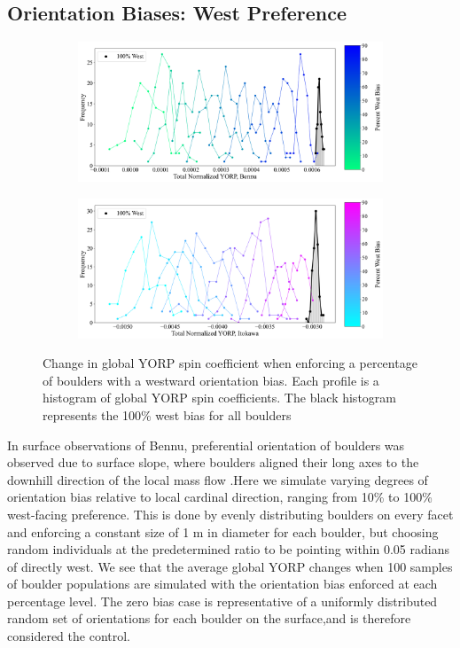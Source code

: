 \subsection{Orientation Biases: West Preference}
\begin{figure}[t!]
    \centering
    \begin{subfigure}{0.49\textwidth}
        \centering
        \includegraphics[width=\textwidth]{fig/bennu_orient_samesize_recreate.png}
    \end{subfigure}
    \hfill
    \begin{subfigure}{0.49\textwidth}
        \centering
        \includegraphics[width=\textwidth]{fig/itokawa_orient_samesize_recreate.png}
    \end{subfigure}
    \caption{Change in global YORP spin coefficient when enforcing a percentage of boulders with a westward orientation bias. Each profile is a histogram of global YORP spin coefficients. The black histogram represents the 100\% west bias for all boulders}
    \label{fig:orient_bias}
\end{figure}

In surface observations of Bennu, preferential orientation of boulders was observed due to surface slope, where boulders aligned their long axes to the downhill direction of the local mass flow \cite{Tang2023}.Here we simulate varying degrees of orientation bias relative to local cardinal direction, ranging from 10\% to 100\% west-facing preference. This is done by evenly distributing boulders on every facet and enforcing a constant size of 1 m in diameter for each boulder, but choosing random individuals at the predetermined ratio to be pointing within 0.05 radians of directly west. We see that the average global YORP changes when 100 samples of boulder populations are simulated with the orientation bias enforced at each percentage level. The zero bias case is representative of a uniformly distributed random set of orientations for each boulder on the surface,and is therefore considered the control.

